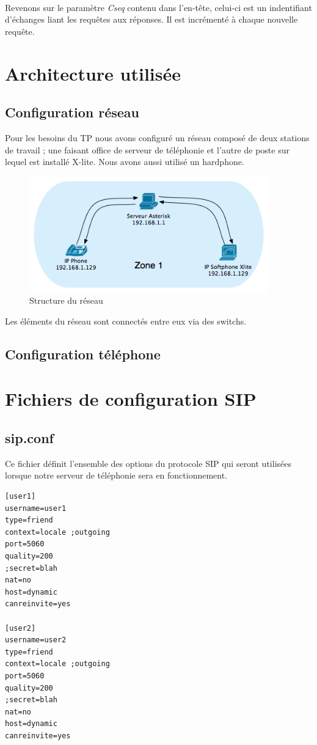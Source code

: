 \documentclass[12pt,a4paper,notitlepage]{article}
\begin{document}
\paragraph{} Revenons sur le paramètre \textit{Cseq} contenu dans l'en-tête, celui-ci est un indentifiant d'échanges liant les requêtes aux réponses. Il est incrémenté à chaque nouvelle requête.

\section{Architecture utilisée}
\subsection{Configuration réseau}
Pour les besoins du TP nous avons configuré un réseau composé de deux stations de travail ; une faisant office de serveur de téléphonie et l'autre de poste sur lequel est installé X-lite. Nous avons aussi utilisé un hardphone.

\begin{figure}[!h]
\begin{center}
\includegraphics[height=5cm]{structure_reseau}
\caption{Structure du réseau}
\label{fig:da}
\end{center}
\end{figure}
Les éléments du réseau sont connectés entre eux via des switchs.

\subsection{Configuration téléphone}
\clearpage
\section{Fichiers de configuration SIP}
\subsection{sip.conf}
Ce fichier définit l'ensemble des options du protocole SIP qui seront utilisées lorsque notre serveur de téléphonie sera en fonctionnement. \\
\begin{lstlisting}[title=sip.conf v1]
[user1]
username=user1
type=friend
context=locale ;outgoing
port=5060
quality=200
;secret=blah
nat=no
host=dynamic
canreinvite=yes

[user2]
username=user2
type=friend
context=locale ;outgoing
port=5060
quality=200
;secret=blah
nat=no
host=dynamic
canreinvite=yes
\end{lstlisting}
\end{document}
